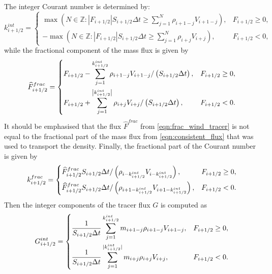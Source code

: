 \documentclass[11pt,a4paper]{article}
\begin{document}
The integer Courant number is determined by:
\begin{equation} \label{eqn:int_courant_tracer}
k^{int}_{i+1/2} = 
\begin{cases}
\max\left(N\in\mathbb{Z} : |F_{i+1/2}|S_{i+1/2} \Delta t \geq\sum_{j=1}^N \rho_{i+1-j} V_{i+1-j} \right), & F_{i+1/2} \geq 0, \\
-\max\left(N\in\mathbb{Z} : |F_{i+1/2}|S_{i+1/2} \Delta t \geq\sum_{j=1}^N \rho_{i+j} V_{i+j} \right), & F_{i+1/2} < 0,
\end{cases}
\end{equation}
while the fractional component of the mass flux is given by
\begin{equation} \label{eqn:frac_wind_tracer}
\widehat{F}^{frac}_{i+1/2} = 
\begin{dcases}
F_{i+1/2}-\sum_{j=1}^{k^{int}_{i+1/2}} \rho_{i+1-j} V_{i+1-j} / \left(S_{i+1/2}\Delta t\right), & F_{i+1/2} \geq 0, \\
F_{i+1/2}+\sum_{j=1}^{\left|k^{int}_{i+1/2}\right|} \rho_{i+j} V_{i+j} / \left(S_{i+1/2}\Delta t\right), & F_{i+1/2} < 0.
\end{dcases}
\end{equation}
It should be emphasised that the flux $\widehat{F}^{frac}$ from \eqref{eqn:frac_wind_tracer} is not equal to the fractional part of the mass flux from \eqref{eqn:consistent_flux} that was used to transport the density.
Finally, the fractional part of the Courant number is given by
\begin{equation} \label{eqn:frac_courant_tracer}
k^{frac}_{i+1/2} =
\begin{dcases}
\widehat{F}^{frac}_{i+1/2} S_{i+1/2}\Delta t / \left(\rho_{i-k^{int}_{i+1/2}} V_{i-k^{int}_{i+1/2}}\right), & F_{i+1/2} \geq 0, \\
\widehat{F}^{frac}_{i+1/2} S_{i+1/2}\Delta t / \left(\rho_{i+1-k^{int}_{i+1/2}} V_{i+1-k^{int}_{i+1/2}} \right), & F_{i+1/2} < 0.
\end{dcases}
\end{equation}
Then the integer components of the tracer flux $G$ is computed as
\begin{equation}
    G^{int}_{i+1/2} = 
    \begin{dcases}
        \frac{1}{S_{i+1/2}\Delta{t}}\sum_{j=1}^{k_{i+1/2}^{int}} m_{i+1-j} \rho_{i+1-j} V_{i+1-j}, & F_{i+1/2} \geq 0, \\
        \frac{1}{S_{i+1/2}\Delta{t}}\sum_{j=1}^{|k_{i+1/2}^{int}|} m_{i+j} \rho_{i+j} V_{i+j}, & F_{i+1/2} < 0.
    \end{dcases}
\end{equation}
\end{document}
